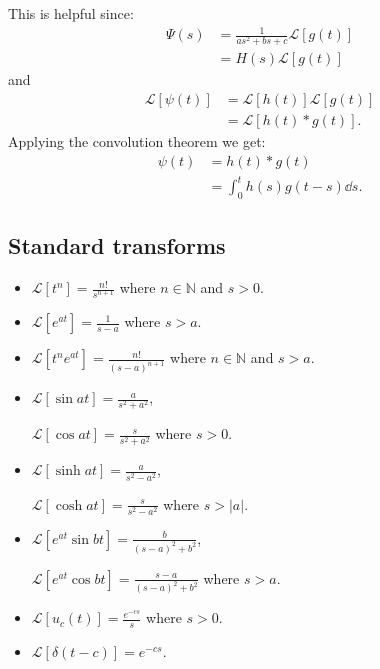 \documentclass{article}
\begin{document}
This is helpful since:
\begin{align*}
    \Psi(s)
    &=\frac{1}{as^2+bs+c}\mathcal{L}[g(t)] \\
    &=H(s)\mathcal{L}[g(t)]
\end{align*}
and
\begin{align*}
    \mathcal{L}[\psi(t)]
    &=\mathcal{L}[h(t)]\mathcal{L}[g(t)] \\
    &=\mathcal{L}[h(t)*g(t)].
\end{align*}
Applying the convolution theorem we get:
\begin{align*}
    \psi(t)
    &=h(t)*g(t) \\
    &=\int_{0}^{t}h(s)g(t-s)\dd s.
\end{align*}

\newpage

\subsection{Standard transforms}
\begin{itemize}
    \item $\displaystyle\mathcal{L}[t^n]
    =\frac{n!}{s^{n+1}}$
    where $n\in\mathbb{N}$ and $s>0$.

    \item $\displaystyle\mathcal{L}[e^{at}]
    =\frac{1}{s-a}$
    where $s>a$.

    \item $\displaystyle\mathcal{L}
    [t^n e^{at}]=\frac{n!}{(s-a)^{n+1}}$
    where $n\in\mathbb{N}$ and $s>a$.

    \item $\displaystyle\mathcal{L}
    [\sin at]=\frac{a}{s^2+a^2}$,
    
    $\displaystyle\mathcal{L}
    [\cos at]=\frac{s}{s^2+a^2}$
    where $s>0$.

    \item $\displaystyle\mathcal{L}
    [\sinh at]=\frac{a}{s^2-a^2}$,

    $\displaystyle\mathcal{L}
    [\cosh at]=\frac{s}{s^2-a^2}$
    where $s>|a|$.

    \item $\displaystyle\mathcal{L}
    [e^{at}\sin bt]=\frac{b}{(s-a)^2+b^2}$,

    $\displaystyle\mathcal{L}
    [e^{at}\cos bt]=\frac{s-a}{(s-a)^2+b^2}$
    where $s>a$.

    \item $\displaystyle\mathcal{L}
    [u_c(t)]=\frac{e^{-cs}}{s}$
    where $s>0$.

    \item $\displaystyle\mathcal{L}
    [\delta(t-c)]=e^{-cs}$.
\end{itemize}
\end{document}
